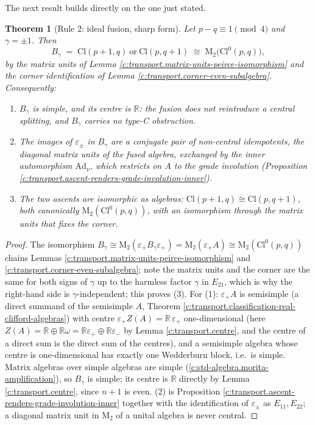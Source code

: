 \documentclass[11pt]{article}
\newtheorem{theorem}{Theorem}[section]
\theoremstyle{definition}
\theoremstyle{plain}
\providecommand{\Cl}{}\renewcommand{\Cl}{\mathrm{Cl}}
\providecommand{\Mat}{}\renewcommand{\Mat}{\mathrm{M}}
\providecommand{\R}{}\renewcommand{\R}{\mathbb{R}}
\begin{document}
The next result builds directly on the one just stated.

\begin{theorem}[Rule 2: ideal fusion, sharp form]\label{c:transport.rule-2-ideal-fusion-sharp-form}
Let $p - q \equiv 1 \pmod 4$ and $\gamma = \pm 1$. Then
\[
B_\gamma \;=\; \Cl(p{+}1,q) \ \text{or}\ \Cl(p,q{+}1) \;\cong\; \Mat_2\bigl(\Cl^0(p,q)\bigr),
\]
by the matrix units of Lemma \ref{c:transport.matrix-units-peirce-isomorphism} and the corner identification of Lemma \ref{c:transport.corner-even-subalgebra}. Consequently:
\begin{enumerate}
\item $B_\gamma$ is simple, and its centre is $\R$: the fusion does not reintroduce a central splitting, and $B_\gamma$ carries no type-C obstruction.
\item The images of $\varepsilon_\pm$ in $B_\gamma$ are a conjugate pair of non-central idempotents, the diagonal matrix units of the fused algebra, exchanged by the inner automorphism $\mathrm{Ad}_\nu$, which restricts on $A$ to the grade involution (Proposition \ref{c:transport.ascent-renders-grade-involution-inner}).
\item The two ascents are isomorphic as algebras: $\Cl(p{+}1,q) \cong \Cl(p,q{+}1)$, both canonically $\Mat_2(\Cl^0(p,q))$, with an isomorphism through the matrix units that fixes the corner.
\end{enumerate}
\end{theorem}
\begin{proof}
The isomorphism $B_\gamma \cong \Mat_2(\varepsilon_+ B_\gamma \varepsilon_+) = \Mat_2(\varepsilon_+ A) \cong \Mat_2(\Cl^0(p,q))$ chains Lemmas \ref{c:transport.matrix-units-peirce-isomorphism} and \ref{c:transport.corner-even-subalgebra}; note the matrix units and the corner are the same for both signs of $\gamma$ up to the harmless factor $\gamma$ in $E_{21}$, which is why the right-hand side is $\gamma$-independent; this proves (3). For (1): $\varepsilon_+ A$ is semisimple (a direct summand of the semisimple $A$, Theorem \ref{c:transport.classification-real-clifford-algebras}) with centre $\varepsilon_+ Z(A) = \R\,\varepsilon_+$ one-dimensional (here $Z(A) = \R \oplus \R\omega = \R\varepsilon_+ \oplus \R\varepsilon_-$ by Lemma \ref{c:transport.centre}, and the centre of a direct sum is the direct sum of the centres), and a semisimple algebra whose centre is one-dimensional has exactly one Wedderburn block, i.e.\ is simple. Matrix algebras over simple algebras are simple (\ref{c:std-algebra.morita-amplification}), so $B_\gamma$ is simple; its centre is $\R$ directly by Lemma \ref{c:transport.centre}, since $n + 1$ is even. (2) is Proposition \ref{c:transport.ascent-renders-grade-involution-inner} together with the identification of $\varepsilon_\pm$ as $E_{11}, E_{22}$; a diagonal matrix unit in $\Mat_2$ of a unital algebra is never central.

\end{proof}
\end{document}
